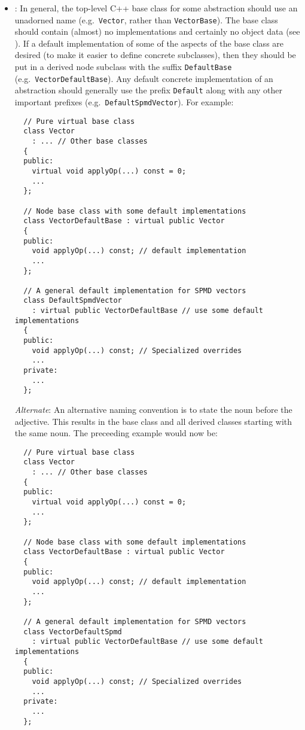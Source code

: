 \begin{itemize}
\item\NCBaseDefaultClassNames: In general, the top-level C++ base
  class for some abstraction should use an unadorned name (e.g.\
  \texttt{Vector}, rather than \texttt{VectorBase}).  The base class
  should contain (almost) no implementations and certainly no object
  data (see \cite[Item 36]{C++CodingStandards05}).  If a default
  implementation of some of the aspects of the base class are desired
  (to make it easier to define concrete subclasses), then they should
  be put in a derived node subclass with the suffix
  \texttt{DefaultBase} (e.g.\ \texttt{Vector\-Default\-Base}).  Any
  default concrete implementation of an abstraction should generally
  use the prefix \texttt{Default} along with any other important
  prefixes (e.g.\ \texttt{DefaultSpmdVector}).  For example:

{\small\begin{verbatim}
  // Pure virtual base class 
  class Vector
    : ... // Other base classes
  {
  public:
    virtual void applyOp(...) const = 0;
    ...
  };

  // Node base class with some default implementations
  class VectorDefaultBase : virtual public Vector
  {
  public:
    void applyOp(...) const; // default implementation
    ...
  };

  // A general default implementation for SPMD vectors
  class DefaultSpmdVector
    : virtual public VectorDefaultBase // use some default implementations
  {
  public:
    void applyOp(...) const; // Specialized overrides
    ...
  private:
    ...
  };
\end{verbatim}}

  \textit{Alternate}: An alternative naming convention is to state the
  noun before the adjective.  This results in the base class and all derived classes starting with the same noun.  The preceeding example would now be:

{\small\begin{verbatim}
  // Pure virtual base class 
  class Vector
    : ... // Other base classes
  {
  public:
    virtual void applyOp(...) const = 0;
    ...
  };

  // Node base class with some default implementations
  class VectorDefaultBase : virtual public Vector
  {
  public:
    void applyOp(...) const; // default implementation
    ...
  };

  // A general default implementation for SPMD vectors
  class VectorDefaultSpmd
    : virtual public VectorDefaultBase // use some default implementations
  {
  public:
    void applyOp(...) const; // Specialized overrides
    ...
  private:
    ...
  };
\end{verbatim}}


\end{itemize}
